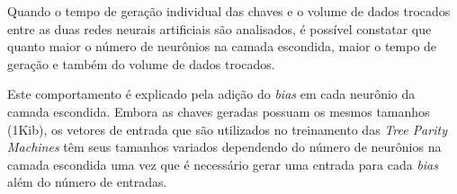 \documentclass[12pt]{article}
\begin{document}
                
                
                

                
                Quando o tempo de geração individual das chaves e o volume de dados trocados entre as duas redes neurais artificiais são analisados, é possível constatar que quanto maior o número de neurônios na camada escondida, maior o tempo de geração e também do volume de dados trocados.
                
                Este comportamento é explicado pela adição do \textit{bias} em cada neurônio da camada escondida. Embora as chaves geradas possuam os mesmos tamanhos (1Kib), os vetores de entrada que são utilizados no treinamento das \textit{Tree Parity Machines} têm seus tamanhos variados dependendo do número de neurônios na camada escondida uma vez que é necessário gerar uma entrada para cada \textit{bias} além do número de entradas.
                
                
\end{document}
